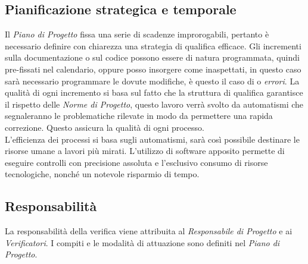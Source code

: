 	\subsection{Pianificazione strategica e temporale}
	Il \emph{Piano di Progetto} fissa una serie di scadenze improrogabili, pertanto è necessario definire con chiarezza una strategia di qualifica efficace. Gli incrementi sulla documentazione o sul codice possono essere di natura programmata, quindi pre-fissati nel calendario, oppure posso insorgere come inaspettati, in questo caso sarà necessario programmare le dovute modifiche, è questo il caso di  o \emph{errori}. La qualità di ogni incremento si basa sul fatto che la struttura di qualifica garantisce il rispetto delle \emph{Norme di Progetto}, questo lavoro verrà svolto da automatismi che segnaleranno le problematiche rilevate in modo da permettere una rapida correzione. Questo assicura la qualità di ogni processo. \\
	L'efficienza dei processi si basa sugli automatismi, sarà così possibile destinare le risorse umane a lavori più mirati. L'utilizzo di software apposito permette di eseguire controlli  con precisione assoluta e l'esclusivo consumo di risorse tecnologiche, nonché un notevole risparmio di tempo.
	
	\subsection{Responsabilità}
	La responsabilità della verifica viene attribuita al \emph{Responsabile di Progetto} e ai \emph{Verificatori}. I compiti e le modalità di attuazione sono definiti nel \emph{Piano di Progetto}.
	
